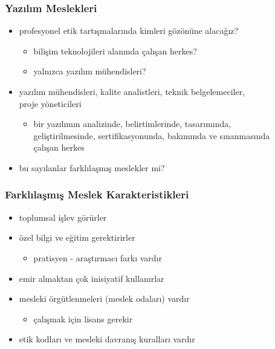 \documentclass[dvipsnames]{beamer}
\theoremstyle{definition}
\theoremstyle{example}
\theoremstyle{plain}
\begin{document}
\begin{frame}
  \frametitle{Yazılım Meslekleri}

  \begin{itemize}
    \item profesyonel etik tartışmalarında kimleri gözönüne alacağız?
    \begin{itemize}
      \item bilişim teknolojileri alanında çalışan herkes?
      \item yalnızca yazılım mühendisleri?
    \end{itemize}

    \pause
    \medskip
    \item yazılım mühendisleri, kalite analistleri, teknik belgelemeciler,\\
      proje yöneticileri
    \begin{itemize}
      \item bir yazılımın analizinde, belirtimlerinde, tasarımında,\\
        geliştirilmesinde, sertifikasyonunda, bakımında ve sınanmasında\\
        çalışan herkes
    \end{itemize}
  \end{itemize}

  \pause
  \bigskip
  \begin{itemize}
    \item bu sayılanlar farklılaşmış meslekler mi?
  \end{itemize}
\end{frame}

\begin{frame}
  \frametitle{Farklılaşmış Meslek Karakteristikleri}

  \begin{itemize}
    \item toplumsal işlev görürler

    \pause
    \item özel bilgi ve eğitim gerektirirler
    \begin{itemize}
      \item pratisyen - araştırmacı farkı vardır
    \end{itemize}

    \pause
    \item emir almaktan çok inisiyatif kullanırlar

    \pause
    \item mesleki örgütlenmeleri (meslek odaları) vardır
    \begin{itemize}
      \item çalışmak için lisans gerekir
    \end{itemize}

    \pause
    \item etik kodları ve mesleki davranış kuralları vardır
  \end{itemize}
\end{frame}
\end{document}
